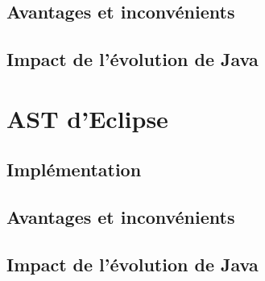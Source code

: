 \documentclass[11pt,french]{article}
\begin{document}
        \subsection{Avantages et inconvénients} %
        \label{sub:avantages-inconvenients}


        \subsection{Impact de l'évolution de Java} %
        \label{sub:impact-evolution-java}


    \section{AST d'Eclipse} %
    \label{sec:ast-eclipse}
        \subsection{Implémentation} %
        \label{sub:implementation}

        \subsection{Avantages et inconvénients} %
        \label{sub:avantages-inconvenients}


        \subsection{Impact de l'évolution de Java} %
        \label{sub:impact-evolution-java}

\end{document}
